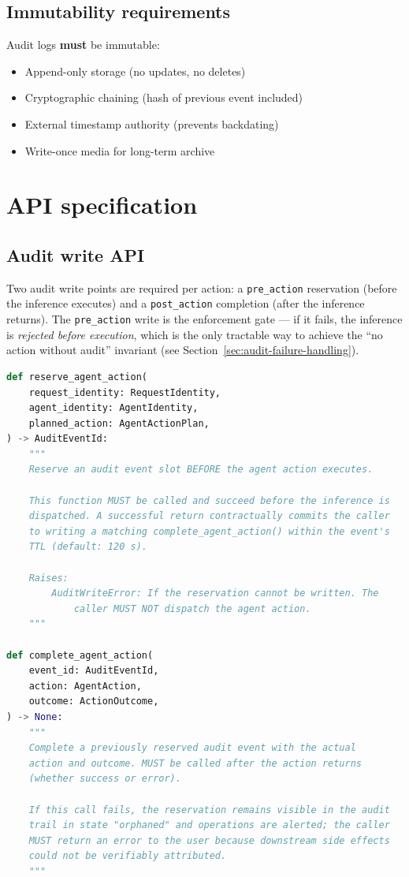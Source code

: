 \subsection{Immutability requirements}

Audit logs \textbf{must} be immutable:
\begin{itemize}
  \item Append-only storage (no updates, no deletes)
  \item Cryptographic chaining (hash of previous event included)
  \item External timestamp authority (prevents backdating)
  \item Write-once media for long-term archive
\end{itemize}

\section{API specification}

\subsection{Audit write API}

Two audit write points are required per action: a
\texttt{pre\_action} reservation (before the inference executes) and
a \texttt{post\_action} completion (after the inference returns). The
\texttt{pre\_action} write is the enforcement gate --- if it fails,
the inference is \emph{rejected before execution}, which is the only
tractable way to achieve the ``no action without audit'' invariant
(see Section~\ref{sec:audit-failure-handling}).

\begin{lstlisting}[language=Python,basicstyle=\ttfamily\small,caption={Audit service API contract.}]
def reserve_agent_action(
    request_identity: RequestIdentity,
    agent_identity: AgentIdentity,
    planned_action: AgentActionPlan,
) -> AuditEventId:
    """
    Reserve an audit event slot BEFORE the agent action executes.

    This function MUST be called and succeed before the inference is
    dispatched. A successful return contractually commits the caller
    to writing a matching complete_agent_action() within the event's
    TTL (default: 120 s).

    Raises:
        AuditWriteError: If the reservation cannot be written. The
            caller MUST NOT dispatch the agent action.
    """

def complete_agent_action(
    event_id: AuditEventId,
    action: AgentAction,
    outcome: ActionOutcome,
) -> None:
    """
    Complete a previously reserved audit event with the actual
    action and outcome. MUST be called after the action returns
    (whether success or error).

    If this call fails, the reservation remains visible in the audit
    trail in state "orphaned" and operations are alerted; the caller
    MUST return an error to the user because downstream side effects
    could not be verifiably attributed.
    """
\end{lstlisting}

